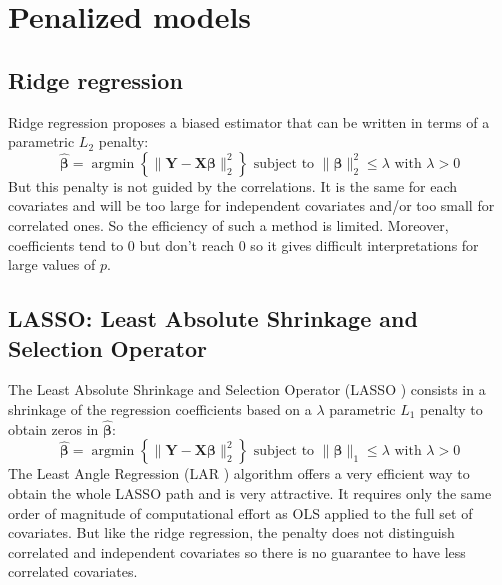 \documentclass[12pt,a4paper]{report}
\begin{document}
	\section{Penalized models}
		\subsection{Ridge regression}		%

Ridge regression \cite{marquardt1975ridge} proposes a biased estimator that can be written in terms of a parametric $L_2$ penalty:
	\begin{equation}
		 \boldsymbol{\hat{\beta}}=\operatorname{argmin} \left\lbrace \parallel \boldsymbol{Y}-\boldsymbol{X\beta}\parallel_2^2 \right\rbrace \textrm{ subject to } \parallel \boldsymbol{\beta} \parallel_2^2\leq \lambda \textrm{ with } \lambda>0
	\end{equation}
	But this penalty is not guided by the correlations. It is the same for each covariates and will be too large for independent covariates and/or too small for correlated ones. So the efficiency of such a method is limited. 
	Moreover, coefficients tend to 0 but don't reach 0 so it gives difficult interpretations for large values of $p$. 
				
			
		\subsection{LASSO: Least Absolute Shrinkage and Selection Operator }		%

			\cite{tibshiranilasso}  
			\cite{tibshirani1996regression} 
			\cite{efron2004least} %
			\cite{Zhao2006MSC}%
			\cite{SAM10088}%
The Least Absolute Shrinkage and Selection Operator (\textsc{LASSO} \cite{tibshirani1996regression}) consists in a shrinkage of the regression coefficients based on a $\lambda$ parametric $L_1$ penalty to obtain zeros in $\hat{\boldsymbol{\beta}}$:
		\begin{equation}
		 \boldsymbol{\hat{\beta}}=\operatorname{argmin} \left\lbrace \parallel \boldsymbol{Y}-\boldsymbol{X\beta}\parallel_2^2 \right\rbrace \textrm{ subject to } \parallel\boldsymbol{\beta} \parallel_1\leq \lambda \textrm{ with } \lambda>0
		\end{equation}	
	 The Least Angle Regression (\textsc{LAR} \cite{efron2004least}) algorithm offers a very efficient way to obtain the whole LASSO path and is very attractive. It requires only the same order of magnitude of computational effort as \textsc{OLS} applied to the full set of covariates. But like the ridge regression, the penalty does not distinguish correlated and independent covariates so there is no guarantee to have less correlated covariates.
\end{document}
